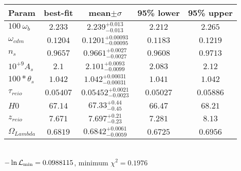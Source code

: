 \begin{tabular}{|l|c|c|c|c|} 
 \hline 
Param & best-fit & mean$\pm\sigma$ & 95\% lower & 95\% upper \\ \hline 
$100~\omega{}_{b }$ &$2.233$ & $2.239_{-0.013}^{+0.013}$ & $2.212$ & $2.265$ \\ 
$\omega{}_{cdm }$ &$0.1204$ & $0.1201_{-0.00095}^{+0.00093}$ & $0.1183$ & $0.1219$ \\ 
$n_{s }$ &$0.9657$ & $0.9661_{-0.0027}^{+0.0027}$ & $0.9608$ & $0.9713$ \\ 
$10^{+9}A_{s }$ &$2.1$ & $2.101_{-0.0099}^{+0.0093}$ & $2.083$ & $2.12$ \\ 
$100*\theta{}_{s }$ &$1.042$ & $1.042_{-0.00031}^{+0.00031}$ & $1.041$ & $1.042$ \\ 
$\tau{}_{reio }$ &$0.05407$ & $0.05452_{-0.0023}^{+0.0021}$ & $0.05027$ & $0.05886$ \\ 
$H0$ &$67.14$ & $67.33_{-0.45}^{+0.44}$ & $66.47$ & $68.21$ \\ 
$z_{reio }$ &$7.671$ & $7.697_{-0.23}^{+0.21}$ & $7.281$ & $8.13$ \\ 
$\Omega{}_{Lambda }$ &$0.6819$ & $0.6842_{-0.0059}^{+0.0061}$ & $0.6725$ & $0.6956$ \\ 
\hline 
 \end{tabular} \\ 
$-\ln{\cal L}_\mathrm{min} =0.0988115$, minimum $\chi^2=0.1976$ \\ 
